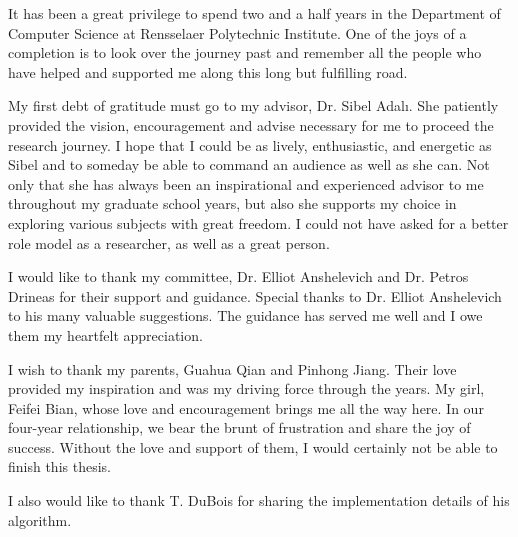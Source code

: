  
 It has been a great privilege to spend two and a half years in the Department of Computer Science at Rensselaer Polytechnic Institute. One of the joys of a completion is to look over the journey past and remember all the people who have helped and supported me along this long but fulfilling road.
 
 My first debt of gratitude must go to my advisor, Dr. Sibel Adal\i. She patiently provided the vision, encouragement and advise necessary for me to proceed the research journey. I hope that I could be as lively, enthusiastic, and energetic as 
Sibel and to someday be able to command an audience as well as she can. Not only that she has always been an inspirational and experienced advisor to me throughout my graduate school years, but also she supports my choice in exploring various subjects with great freedom. I could not have asked for a better role model as a researcher, as well as a great person.


I would like to thank my committee, Dr. Elliot Anshelevich and Dr. Petros Drineas for their support and guidance. Special thanks to Dr. Elliot Anshelevich to his many valuable suggestions. The guidance has served me well and I owe them my heartfelt appreciation.
 
I wish to thank my parents, Guahua Qian and Pinhong Jiang. Their love provided my inspiration and was my driving force through the years. My girl, Feifei Bian, whose love and encouragement brings me all the way here. In our four-year relationship, we bear the brunt of frustration and share the joy of success.  Without the love and support of them, I would certainly not be able to finish this thesis.

I also would like to thank T. DuBois for sharing the implementation details of his algorithm.
